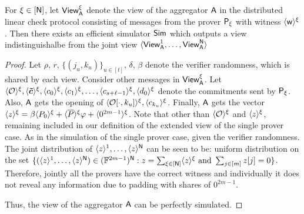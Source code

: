 \begin{lemma}\label{lem:distlincheckzk}
	For $\xi\in [\mathsf{N}]$, let $\mathsf{View}^\xi_{\mathsf{A}}$ denote the view of the aggregator $\mathsf{A}$ in the distributed
	linear check protocol consisting of messages from the prover $\mathsf{P}_\xi$ with
	witness $\langle{\mathsf{w}}\rangle^\xi$. Then there exists an efficient simulator $\mathsf{Sim}$
	which outputs a view indistinguishalbe from the joint view $\langle
	\mathsf{View}^1_{\mathsf{A}},\ldots,\mathsf{View}^{\mathsf{N}}_{\mathsf{A}}\rangle$ 
\end{lemma}
\begin{proof}
	
	Let  $\rho, \, r, \, \{(j_u,k_u)\}_{u\in[t]}, \, \delta, \, \beta$ denote the verifier
	randomness, which is shared by each view. Consider other messages in
	$\mathsf{View}^\xi_{\mathsf{A}}$. Let $\langle{\mathcal{O}}\rangle^\xi, \langle{\bm{\tilde{c}}}\rangle^\xi, \langle{c_0}\rangle^\xi, \langle{c_1}\rangle^\xi, \ldots, \langle{c_{s+\ell-1}}\rangle^\xi, \langle{d_0}\rangle^\xi$ 
	denote the commitments sent by $\mathsf{P}_\xi$. Also, $\mathsf{A}$ gets the opening of $\langle{\mathcal{O}[\cdot,k_u]}\rangle^\xi, \langle{c_{k_u}}\rangle^\xi$.
	Finally, $\mathsf{A}$ gets the vector $\langle{z}\rangle^\xi = \beta\langle{P_0}\rangle^\xi + \langle{\overline{P}}\rangle^\xi\varphi + \langle{0^{2m-1}}\rangle^\xi$.
	Note that other than $\langle{\mathcal{O}}\rangle^\xi$ and $\langle{z}\rangle^\xi$, remaining
	included in our definition of the extended view of the single prover case. As in the simulation of the
	single prover case, given the verifier randomness. The joint distribution of $\langle{z}\rangle^1,\ldots,\langle{z}\rangle^{\mathsf{N}}$ can be seen to be:
		uniform distribution on the set $\{(\langle{z}\rangle^1,\ldots,\langle{z}\rangle^{\mathsf{N}})\in (\mathbb{F}^{2m-1})^{\mathsf{N}}: z=\sum_{\xi\in[\mathsf{N}]}\langle{z}\rangle^\xi \text{ and } \sum_{j\in[m]} z[j]=0 \}$. %
		Therefore, jointly all the provers have the correct witness and individually it does not reveal any information due to padding with shares of $0^{2m-1}$.
	
	Thus, the view of the aggregator $\mathsf{A}$ can be perfectly simulated.
\end{proof}


